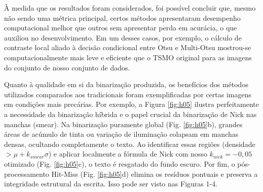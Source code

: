 \documentclass[conference]{IEEEtran}
\begin{document}
À medida que os resultados foram considerados, foi possível concluir que, mesmo não sendo uma métrica principal, certos métodos apresentaram desempenho computacional melhor que outros sem apresentar perda em acurácia, o que auxiliou no desenvolvimento. Em um desses casos, por exemplo, o cálculo de contraste local aliado à decisão condicional entre Otsu e Multi-Otsu mostrou-se computacionalmente mais leve e eficiente que o TSMO original para as imagens do conjunto de nosso conjunto de dados.

Quanto à qualidade em si da binarização produzida, os benefícios dos métodos utilizados comparados aos tradicionais foram exemplificadas por certas imagens em condições mais precárias. Por exemplo, a Figura \ref{fig:h05} ilustra perfeitamente a necessidade da binarização híbrida e o papel crucial da binarização de Nick nas manchas (smear). Na binarização puramente global (Fig. \ref{fig:h05}b), grandes áreas de acúmulo de tinta ou variação de iluminação colapsam em manchas densas, ocultando completamente o texto. Ao identificar essas regiões (densidade $> \mu + k_{smear}\sigma$) e aplicar localmente a fórmula de Nick com nosso $k_{nick}=-0,05$ otimizado (Fig. \ref{fig:h05}c), o texto é resgatado do fundo escuro. Por fim, o pós-processamento Hit-Miss (Fig. \ref{fig:h05}d) elimina os resíduos pontuais e preserva a integridade estrutural da escrita. Isso pode ser visto nas Figuras 1-4.
\end{document}
